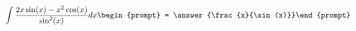 \documentclass{ximera}
\author{Steven Gubkin}
\begin{document}
\begin{exercise}



\[
\int  \frac{2x\sin(x) - x^2\cos(x)}{\sin^2(x)}dx \begin{prompt} = \answer{\frac{x}{\sin(x)}}\end{prompt}
\]

\end{exercise}
\end{document}
